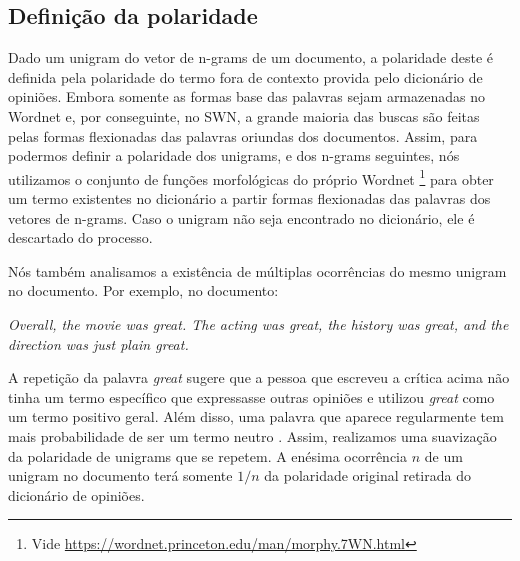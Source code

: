 \documentclass[template.tex]{subfiles}
\begin{document}
\subsection{Definição da polaridade}




Dado um unigram do vetor de n-grams de um documento, a polaridade deste é definida pela polaridade do termo fora de contexto provida pelo dicionário de opiniões. Embora somente as formas base das palavras sejam armazenadas no Wordnet e, por conseguinte, no SWN, a grande maioria das buscas são feitas pelas formas flexionadas das palavras oriundas dos documentos. Assim, para podermos definir a polaridade dos unigrams, e dos n-grams seguintes, nós utilizamos o conjunto de funções morfológicas do próprio Wordnet \footnote{Vide \url{https://wordnet.princeton.edu/man/morphy.7WN.html}} para obter um termo existentes no dicionário a partir formas flexionadas das palavras dos vetores de n-grams. Caso o unigram não seja encontrado no dicionário, ele é descartado do processo.


Nós também analisamos a existência de múltiplas ocorrências do mesmo unigram no documento. Por exemplo, no documento:

\textit{Overall, the movie was great. The acting was great, the history was great, and the direction was just plain great.}

A repetição da palavra \textit{great} sugere que a pessoa que escreveu a crítica acima não tinha um termo específico que expressasse outras opiniões e utilizou \textit{great} como um termo positivo geral. Além disso, uma palavra que aparece regularmente tem mais probabilidade de ser um termo neutro \cite{taboada2011lexicon}. Assim, realizamos uma suavização da polaridade de unigrams que se repetem. A enésima ocorrência $n$ de um unigram no documento terá somente $1/n$ da polaridade original retirada do dicionário de opiniões.
\end{document}
